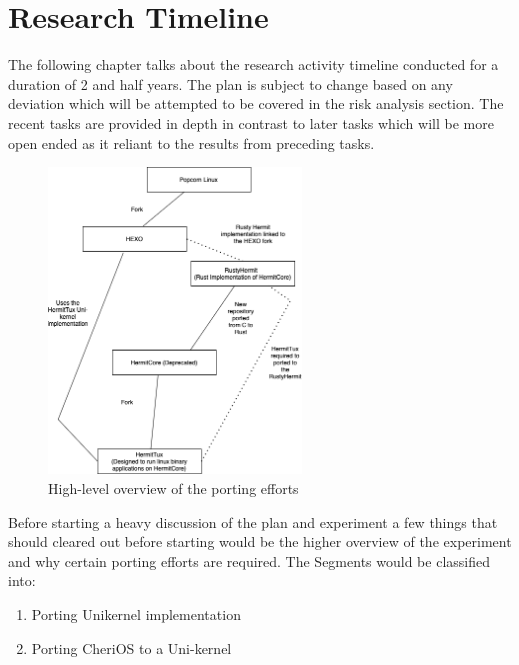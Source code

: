 


\chapter{Research Timeline}  %

\ifpdf
    \graphicspath{{ResearchTimeline/Figs/Raster/}{ResearchTimeline/Figs/PDF/}{ResearchTimeline/Figs/}}
\else
    \graphicspath{{ResearchTimeline/Figs/}{ResearchTimeline/Figs/}}
\fi

The following chapter talks about the research activity timeline conducted for a duration of 2 and half years. 
The plan is subject to change based on any deviation which will be attempted to be covered in the risk analysis 
section. The recent tasks are provided in depth in contrast to later tasks which will be more open ended 
as it reliant to the results from preceding tasks. 

\begin{figure}[htbp!] 
  \centering    
  \includegraphics[width=0.6\textwidth]{PlannerActivity}
  \caption[Planner]{High-level overview of the porting efforts}
  \label{fig:PlannerPorting}
  \end{figure}

Before starting a heavy discussion of the plan and experiment a few things that should cleared out before starting would be 
the higher overview of the experiment and why certain porting efforts are required. The Segments would be classified into: 
\begin{enumerate}
  \item Porting Unikernel implementation 
  \item Porting CheriOS to a Uni-kernel
\end{enumerate}

